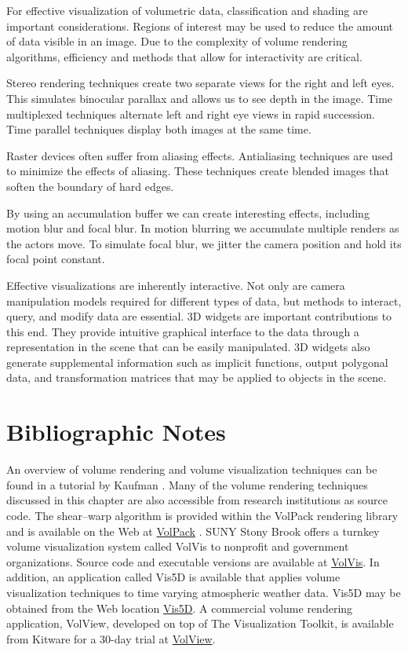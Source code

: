 For effective visualization of volumetric data, classification and shading are important considerations. Regions of interest may be used to reduce the amount of data visible in an image. Due to the complexity of volume rendering algorithms, efficiency and methods that allow for interactivity are critical.

Stereo rendering techniques create two separate views for the right and left eyes. This simulates binocular parallax and allows us to see depth in the image. Time multiplexed techniques alternate left and right eye views in rapid succession. Time parallel techniques display both images at the same time.

Raster devices often suffer from aliasing effects. Antialiasing techniques are used to minimize the effects of aliasing. These techniques create blended images that soften the boundary of hard edges.

By using an accumulation buffer we can create interesting effects, including motion blur and focal blur. In motion blurring we accumulate multiple renders as the actors move. To simulate focal blur, we jitter the camera position and hold its focal point constant.

Effective visualizations are inherently interactive. Not only are camera manipulation models required for different types of data, but methods to interact, query, and modify data are essential. 3D widgets are important contributions to this end. They provide intuitive graphical interface to the data through a representation in the scene that can be easily manipulated. 3D widgets also generate supplemental information such as implicit functions, output polygonal data, and transformation matrices that may be applied to objects in the scene.

\section{Bibliographic Notes}

An overview of volume rendering and volume visualization techniques can be found in a tutorial by Kaufman \cite{Kaufman91}. Many of the volume rendering techniques discussed in this chapter are also accessible from research institutions as source code. The shear--warp algorithm is provided within the VolPack rendering library and is available on the Web at \href{http:www-graphics.stanford.edu/software/volpack/}{VolPack} . SUNY Stony Brook offers a turnkey volume visualization system called VolVis to nonprofit and government organizations. Source code and executable versions are available at \href{http://www.cs.sunysb.edu/\~volvis}{VolVis}. In addition, an application called Vis5D is available that applies volume visualization techniques to time varying atmospheric weather data. Vis5D may be obtained from the Web location \href{http://vis5d.sourceforge.net}{Vis5D}. A commercial volume rendering application, VolView, developed on top of The Visualization Toolkit, is available from Kitware for a 30-day trial at \href{http://www.kitware.com/products/volview.html}{VolView}.


